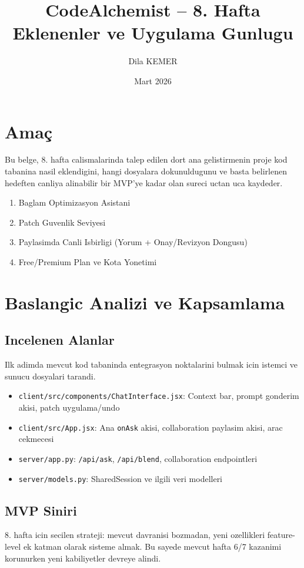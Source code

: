 \documentclass[12pt,a4paper]{article}
\title{CodeAlchemist -- 8. Hafta Eklenenler ve Uygulama Gunlugu}
\author{Dila KEMER}
\date{Mart 2026}
\begin{document}
\maketitle
\tableofcontents
\newpage

\section{Ama\c{c}}
Bu belge, 8. hafta calismalarinda talep edilen dort ana gelistirmenin proje kod tabanina nasil eklendigini,
hangi dosyalara dokunuldugunu ve basta belirlenen hedeften canliya alinabilir bir MVP'ye kadar olan sureci uctan uca kaydeder.

\begin{enumerate}[leftmargin=*]
  \item Baglam Optimizasyon Asistani
  \item Patch Guvenlik Seviyesi
  \item Paylasimda Canli Isbirligi (Yorum + Onay/Revizyon Dongusu)
  \item Free/Premium Plan ve Kota Yonetimi
\end{enumerate}

\section{Baslangic Analizi ve Kapsamlama}
\subsection{Incelenen Alanlar}
Ilk adimda mevcut kod tabaninda entegrasyon noktalarini bulmak icin istemci ve sunucu dosyalari tarandi.

\begin{itemize}[leftmargin=*]
  \item \texttt{client/src/components/ChatInterface.jsx}: Context bar, prompt gonderim akisi, patch uygulama/undo
  \item \texttt{client/src/App.jsx}: Ana \texttt{onAsk} akisi, collaboration paylasim akisi, arac cekmecesi
  \item \texttt{server/app.py}: \texttt{/api/ask}, \texttt{/api/blend}, collaboration endpointleri
  \item \texttt{server/models.py}: SharedSession ve ilgili veri modelleri
\end{itemize}

\subsection{MVP Siniri}
8. hafta icin secilen strateji: mevcut davranisi bozmadan, yeni ozellikleri feature-level ek katman olarak sisteme almak.
Bu sayede mevcut hafta 6/7 kazanimi korunurken yeni kabiliyetler devreye alindi.
\end{document}
